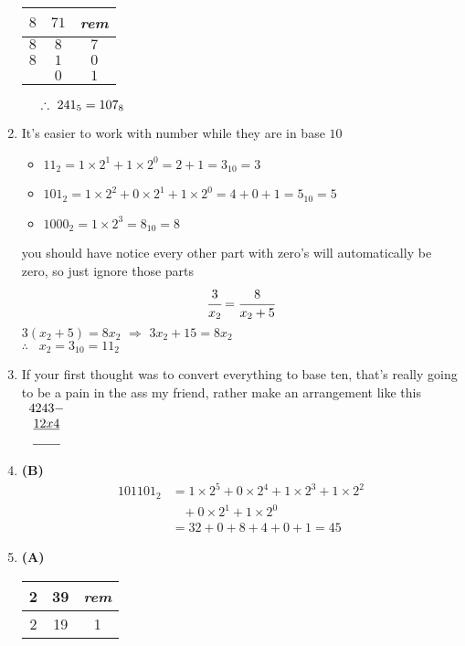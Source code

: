 \begin{multicols}{2}
\begin{enumerate}[label={\arabic*.}]
    \begin{tabular}{c|cc}
        $8$ & $71$ & \textit{rem}\\ \hline
        $8$ & $8$ & $7$ \\ \hline 
        $8$ & $1$ & $0$ \\ \hline 
        & $0$ & $1$
    \end{tabular}
    $ \hspace{.2in}\therefore \,\, 241_5 = 107_8$
    \item It's easier to work with number while they are in base $10$ 
    \begin{itemize}
        \item $11_2  = 1 \times 2^1 + 1 \times 2^0 = 2 + 1 = 3_{10} = 3$ 
        \item$101_2 = 1\times 2^2 + 0\times 2^1 + 1\times 2^0 = 4 + 0 + 1 = 5_{10} = 5$ 
        \item $1000_2 = 1\times 2^3 = 8_{10} = 8$
    \end{itemize}
    you should have notice every other part with zero's will automatically be zero, so just ignore those parts
    $$\cfrac{3}{x_2} = \cfrac{8}{x_2 + 5} $$ 
    $3(x_2 + 5) = 8x_2 \,\, \Rightarrow \,\, 3x_2 + 15 = 8x_2$ \\
$\therefore \hspace{10pt} x_2 = 3_{10} = 11_{2}$
    \item If your first thought was to convert everything to base ten, that's really going to be a pain in the ass my friend, rather make an arrangement like this \\
    $\begin{array}{c}
        4243 
       -\cr \underline{12x4}\\
       \underline{\hspace{.3in}}
    \end{array}$
    \item \textbf{(B)} \begin{align*} 
        101101_2 &= 1 \times 2^5 + 0 \times 2^4 + 1 \times 2^3 + 1 \times 2^2  \\ & \hspace{10pt} + 0 \times 2^1 + 1\times 2^0 \\
        & = 32 + 0 + 8 + 4 + 0 + 1 = 45
    \end{align*}
    \item \textbf{(A)} \begin{tabular}{c|cc}
        2&39& \textit{rem} \\ \hline
        2&19& 1 \\ \hline

\end{tabular}
\end{enumerate}
\end{multicols}
